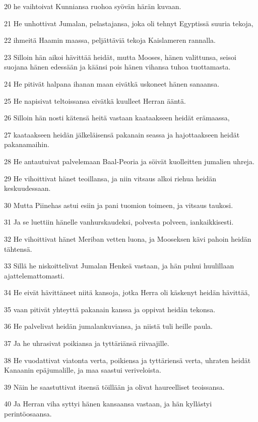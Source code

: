 \par 20 he vaihtoivat Kunniansa ruohoa syövän härän kuvaan.
\par 21 He unhottivat Jumalan, pelastajansa, joka oli tehnyt Egyptissä suuria tekoja,
\par 22 ihmeitä Haamin maassa, peljättäviä tekoja Kaislameren rannalla.
\par 23 Silloin hän aikoi hävittää heidät, mutta Mooses, hänen valittunsa, seisoi suojana hänen edessään ja käänsi pois hänen vihansa tuhoa tuottamasta.
\par 24 He pitivät halpana ihanan maan eivätkä uskoneet hänen sanaansa.
\par 25 He napisivat teltoissansa eivätkä kuulleet Herran ääntä.
\par 26 Silloin hän nosti kätensä heitä vastaan kaataakseen heidät erämaassa,
\par 27 kaataakseen heidän jälkeläisensä pakanain seassa ja hajottaakseen heidät pakanamaihin.
\par 28 He antautuivat palvelemaan Baal-Peoria ja söivät kuolleitten jumalien uhreja.
\par 29 He vihoittivat hänet teoillansa, ja niin vitsaus alkoi riehua heidän keskuudessaan.
\par 30 Mutta Piinehas astui esiin ja pani tuomion toimeen, ja vitsaus taukosi.
\par 31 Ja se luettiin hänelle vanhurskaudeksi, polvesta polveen, iankaikkisesti.
\par 32 He vihoittivat hänet Meriban vetten luona, ja Mooseksen kävi pahoin heidän tähtensä.
\par 33 Sillä he niskoittelivat Jumalan Henkeä vastaan, ja hän puhui huulillaan ajattelemattomasti.
\par 34 He eivät hävittäneet niitä kansoja, jotka Herra oli käskenyt heidän hävittää,
\par 35 vaan pitivät yhteyttä pakanain kanssa ja oppivat heidän tekonsa.
\par 36 He palvelivat heidän jumalankuviansa, ja niistä tuli heille paula.
\par 37 Ja he uhrasivat poikiansa ja tyttäriänsä riivaajille.
\par 38 He vuodattivat viatonta verta, poikiensa ja tyttäriensä verta, uhraten heidät Kanaanin epäjumalille, ja maa saastui veriveloista.
\par 39 Näin he saastuttivat itsensä töillään ja olivat haureelliset teoissansa.
\par 40 Ja Herran viha syttyi hänen kansaansa vastaan, ja hän kyllästyi perintöosaansa.
